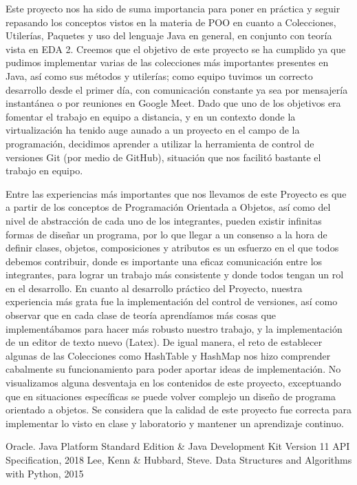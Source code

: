 \documentclass[11pt]{article}
\begin{document}
Este proyecto nos ha sido de suma importancia para poner en práctica y seguir repasando los conceptos vistos en la materia de POO en cuanto a Colecciones, Utilerías, Paquetes y uso del lenguaje Java en general, en conjunto con teoría vista en EDA 2. Creemos que el objetivo de este proyecto se ha cumplido ya que pudimos implementar varias de las colecciones más importantes presentes en Java, así como sus métodos y utilerías; como equipo tuvimos un correcto desarrollo desde el primer día, con comunicación constante ya sea por mensajería instantánea o por reuniones en Google Meet. Dado que uno de los objetivos era fomentar el trabajo en equipo a distancia, y en un contexto donde la virtualización ha tenido auge aunado a un proyecto en el campo de la programación, decidimos aprender a utilizar la herramienta de control de versiones Git (por medio de GitHub), situación que nos facilitó bastante el trabajo en equipo.
\par
Entre las experiencias más importantes que nos llevamos de este Proyecto es que a partir de los conceptos de Programación Orientada a Objetos, así como del nivel de abstracción de cada uno de los integrantes, pueden existir infinitas formas de diseñar un programa, por lo que llegar a un consenso a la hora de definir clases, objetos, composiciones y atributos es un esfuerzo en el que todos debemos contribuir, donde es importante una eficaz comunicación entre los integrantes, para lograr un trabajo más consistente y donde todos tengan un rol en el desarrollo. En cuanto al desarrollo práctico del Proyecto, nuestra experiencia más grata fue la implementación del control de versiones, así como observar que en cada clase de teoría aprendíamos más cosas que implementábamos para hacer más robusto nuestro trabajo, y la implementación de un editor de texto nuevo (Latex). De igual manera, el reto de establecer algunas de las Colecciones como HashTable y HashMap nos hizo comprender cabalmente su funcionamiento para poder aportar ideas de implementación. No visualizamos alguna desventaja en los contenidos de este proyecto, exceptuando que en situaciones específicas se puede volver complejo un diseño de programa orientado a objetos. Se considera que la calidad de este proyecto fue correcta para implementar lo visto en clase y laboratorio y mantener un aprendizaje continuo.

\begin{thebibliography}{0}
 Oracle. Java Platform Standard Edition \& Java Development Kit
Version 11 API Specification, 2018
 Lee, Kenn \& Hubbard, Steve. Data Structures and Algorithms with Python, 2015
\end{thebibliography}
\end{document}
